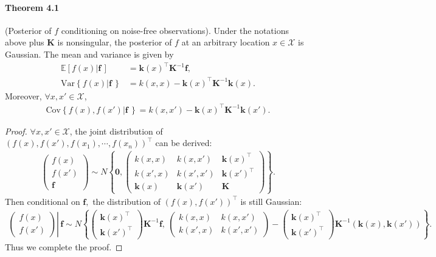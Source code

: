 \documentclass{article}
\begin{document}
\paragraph{Theorem 4.1} (Posterior of $f$ conditioning on noise-free observations). Under the notations above plus $\mathbf{K}$ is nonsingular, the posterior of $f$ at an arbitrary location $x\in\mathcal{X}$ is Gaussian. The mean and variance is given by
\begin{align*}
	\mathbb{E}\left[f(x)|\mathbf{f}\,\right] &= \mathbf{k}(x)^\top\mathbf{K}^{-1} \mathbf{f},\tag{4.2}\\
	\mathrm{Var}\left\lbrace f(x)|\mathbf{f}\,\right\rbrace &= k(x,x) - \mathbf{k}(x)^\top\mathbf{K}^{-1}\mathbf{k}(x).\tag{4.3}
\end{align*}
Moreover, $\forall x,x'\in\mathcal{X}$,
\begin{align*}
	\mathrm{Cov}\left\lbrace f(x), f(x')|\mathbf{f}\,\right\rbrace = k(x,x') - \mathbf{k}(x)^\top\mathbf{K}^{-1} \mathbf{k}(x').\tag{4.4}
\end{align*}
\begin{proof}
$\forall x,x'\in\mathcal{X}$, the joint distribution of $\left(f(x),f(x'),f(x_1),\cdots,f(x_n)\right)^\top$ can be derived:
\begin{align*}
	\begin{pmatrix} f(x) \\ f(x') \\ \mathbf{f}\end{pmatrix} \sim N\left\lbrace \mathbf{0},\begin{pmatrix}
		k(x,x) & k(x,x') & \mathbf{k}(x)^\top \\
		k(x', x) & k(x',x') & \mathbf{k}(x')^\top \\
		\mathbf{k}(x) & \mathbf{k}(x') & \mathbf{K}
	\end{pmatrix}\right\rbrace.\tag{4.5}
\end{align*}
Then conditional on $\mathbf{f},$  the distribution of $(f(x),f(x'))^\top$ is still Gaussian:
\begin{align*}
	\left.\begin{pmatrix} f(x) \\ f(x')\end{pmatrix}\right|\,\mathbf{f} \sim N\left\lbrace
	\begin{pmatrix}
		\mathbf{k}(x)^\top \\
		\mathbf{k}(x')^\top
	\end{pmatrix}\mathbf{K}^{-1}\mathbf{f},\ 
	\begin{pmatrix}
		k(x,x) & k(x,x') \\
		k(x', x) & k(x',x')
	\end{pmatrix} - \begin{pmatrix}
		\mathbf{k}(x)^\top \\
		\mathbf{k}(x')^\top
	\end{pmatrix}\mathbf{K}^{-1}\left(\mathbf{k}(x),\mathbf{k}(x')\right)\right\rbrace.\tag{4.6}
\end{align*}
Thus we complete the proof.
\end{proof} 
\end{document}
